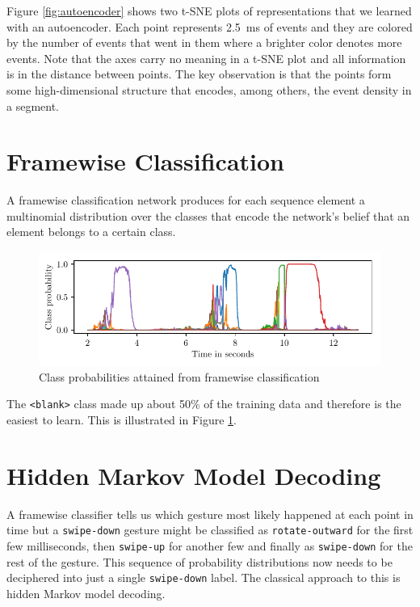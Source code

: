 
Figure \ref{fig:autoencoder} shows two t-SNE plots of representations that we
learned with an autoencoder. Each point represents \SI{2.5}{\milli\second} of
events and they are colored by the number of events that went in them where a
brighter color denotes more events. Note that the axes carry no meaning in a
t-SNE plot and all information is in the distance between points. The key
observation is that the points form some high-dimensional structure that
encodes, among others, the event density in a segment.

\section{Framewise Classification}
\label{sec:framewise}

A framewise classification network produces for each sequence element a
multinomial distribution over the classes that encode the network's belief that
an element belongs to a certain class.


\begin{figure}[h]
  \centering
  \includegraphics{figures/methods/framewise}
  \caption{Class probabilities attained from framewise classification}
  \label{fig:framewise-p}
\end{figure}

The \texttt{<blank>} class made up about 50\% of the training data and therefore
is the easiest to learn. This is illustrated in Figure \ref{fig:framewise-p}.

\section{Hidden Markov Model Decoding}
\label{sec:hmm}

A framewise classifier tells us which gesture most likely happened at each point
in time but a \texttt{swipe-down} gesture might be classified as
\texttt{rotate-outward} for the first few milliseconds, then \texttt{swipe-up}
for another few and finally as \texttt{swipe-down} for the rest of the gesture.
This sequence of probability distributions now needs to be deciphered into just
a single \texttt{swipe-down} label. The classical approach to this is hidden
Markov model decoding.

